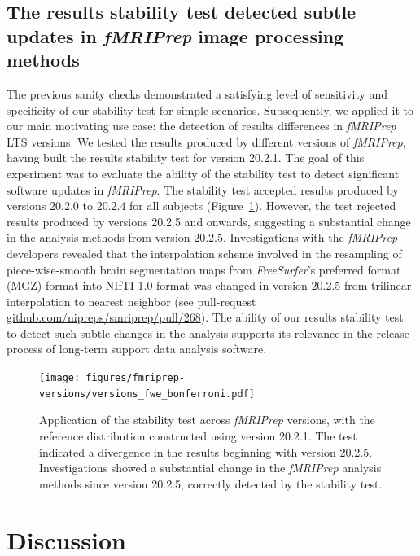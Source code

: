 \documentclass[lettersize,journal]{IEEEtran}
\newcommand{\fmriprep}{\emph{fMRIPrep}\xspace}
\begin{document}
{\subsection{The results stability test detected subtle updates in \fmriprep image processing methods}

The previous sanity checks demonstrated a satisfying level of sensitivity and specificity of our stability test for simple scenarios. Subsequently, we applied it to our main motivating use case: the detection of results differences in \fmriprep LTS versions. We tested the results produced by different versions of \fmriprep, having built the results stability test for version 20.2.1. The goal of this experiment was to evaluate the ability of the stability test to detect significant software updates in \fmriprep. The stability test accepted results produced by versions 20.2.0 to 20.2.4 for all subjects (Figure~\ref{fig:version_bonferroni}). However, the test rejected results produced by versions 20.2.5 and onwards, suggesting a substantial change in the analysis methods from version 20.2.5. Investigations with the \fmriprep developers revealed that the interpolation scheme involved in the resampling of piece-wise-smooth brain segmentation maps from \emph{FreeSurfer}'s preferred format (MGZ) format into NIfTI 1.0 format was changed in version {20.2.5} from trilinear interpolation to nearest neighbor (see pull-request \href{https://github.com/nipreps/smriprep/pull/268}{\url{github.com/nipreps/smriprep/pull/268}}). The ability of our results stability test to detect such subtle changes in the analysis supports its relevance in the release process of long-term support data analysis software.

\begin{figure}
  \centering
  \texttt{[image: figures/fmriprep-versions/versions\_fwe\_bonferroni.pdf]}
  \caption{Application of the stability test across \fmriprep versions, with the reference distribution constructed using version 20.2.1. The test indicated a divergence in the results beginning with version 20.2.5. Investigations showed a substantial change in the \fmriprep analysis methods since version 20.2.5, correctly detected by the stability test.}
  \label{fig:version_bonferroni}
\end{figure}


\section{Discussion}

}
\end{document}
